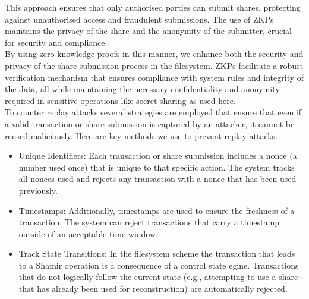 \documentclass{tufte-handout}
\begin{document}
This approach ensures that only authorised parties can submit shares, protecting against unauthorised access and fraudulent submissions. The use of ZKPs
maintains the privacy of the share and the anonymity of the submitter, crucial for security and compliance. \\
\vspace{10pt}
By using zero-knowledge proofs in this manner, we enhance both the security and privacy of the share submission process in the filesystem. ZKPs
facilitate a robust verification mechanism that ensures compliance with system rules and integrity of the data, all while maintaining the necessary
confidentiality and anonymity required in sensitive operations like secret sharing as used here. \\
\vspace{10pt}
To counter replay attacks several strategies are employed that ensure that even if a valid transaction or share submission is captured by an attacker, it cannot be
reused maliciously. Here are key methods we use to prevent replay attacks:
\begin{itemize}
  \item Unique Identifiers: Each transaction or share submission includes a nonce (a number used once) that is unique to that specific action.
  The system tracks all nonces used and rejects any transaction with a nonce that has been used previously.
  \item Timestamps: Additionally, timestamps are used to ensure the freshness of a transaction. The system can reject transactions that carry a timestamp
  outside of an acceptable time window.
  \item Track State Transitions: In the filesystem scheme the transaction that leads to a Shamir operation is a consequence of a control state egine. Transactions
  that do not logically follow the current state (e.g., attempting to use a share that has already been used for reconstruction) are automatically rejected.
\end{itemize}

\end{document}
